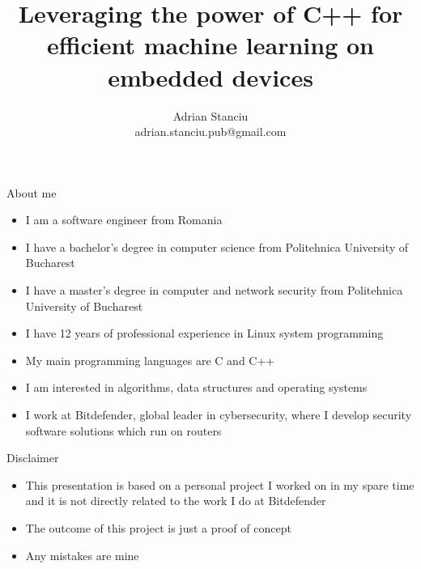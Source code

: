 \documentclass{beamer}
\title{Leveraging the power of C++ for efficient machine learning on embedded
devices}
\subtitle{}
\author{Adrian Stanciu\\{\small adrian.stanciu.pub@gmail.com}}
\date{}
\institute{CppCon, 2023}
\begin{document}
{
  \begin{frame}
  \end{frame}
}

\frame{\titlepage}

\begin{frame}{About me}
  \begin{itemize}
	\item I am a software engineer from Romania
	\item I have a bachelor's degree in computer science from Politehnica
	University of Bucharest
	\item I have a master's degree in computer and network security from
	Politehnica University of Bucharest
	\item I have 12 years of professional experience in Linux system
	programming
	\item My main programming languages are C and C++
	\item I am interested in algorithms, data structures and operating systems
	\item I work at Bitdefender, global leader in cybersecurity, where I
	develop security software solutions which run on routers
  \end{itemize}
\end{frame}

\begin{frame}{Disclaimer}
  \begin{itemize}
	\item This presentation is based on a personal project I worked on in my
	spare time and it is not directly related to the work I do at Bitdefender
	\item The outcome of this project is just a proof of concept
	\item Any mistakes are mine
  \end{itemize}
\end{frame}
\end{document}
